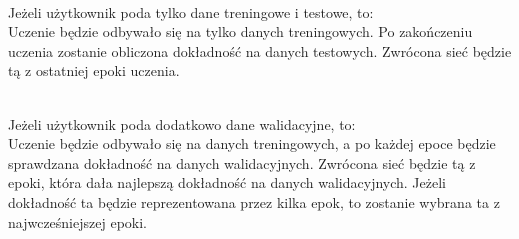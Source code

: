 \noindent\\
Jeżeli użytkownik poda tylko dane treningowe i testowe, to:\\
Uczenie będzie odbywało się na tylko danych treningowych.
Po zakończeniu uczenia zostanie obliczona dokładność na danych testowych.
Zwrócona sieć będzie tą z ostatniej epoki uczenia.

\noindent\\
Jeżeli użytkownik poda dodatkowo dane walidacyjne, to:\\
Uczenie będzie odbywało się na danych treningowych,
a po każdej epoce będzie sprawdzana dokładność na danych walidacyjnych.
Zwrócona sieć będzie tą z epoki,
która dała najlepszą dokładność na danych walidacyjnych.
Jeżeli dokładność ta będzie reprezentowana przez kilka epok,
to zostanie wybrana ta z najwcześniejszej epoki. %

